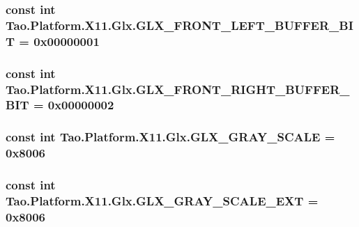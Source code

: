 \label{class_tao_1_1_platform_1_1_x11_1_1_glx_a9058319d3f2837e9c43e7822f0ce1f53}
\hypertarget{class_tao_1_1_platform_1_1_x11_1_1_glx_ab5e6633688255a2b3c1c2936c49b163e}{
\subsubsection[{GLX\_\-FRONT\_\-LEFT\_\-BUFFER\_\-BIT}]{\setlength{\rightskip}{0pt plus 5cm}const int {\bf Tao.Platform.X11.Glx.GLX\_\-FRONT\_\-LEFT\_\-BUFFER\_\-BIT} = 0x00000001}}
\label{class_tao_1_1_platform_1_1_x11_1_1_glx_ab5e6633688255a2b3c1c2936c49b163e}
\hypertarget{class_tao_1_1_platform_1_1_x11_1_1_glx_adc5d0545c96bfb8b1bdd0de0ef29cb0e}{
\subsubsection[{GLX\_\-FRONT\_\-RIGHT\_\-BUFFER\_\-BIT}]{\setlength{\rightskip}{0pt plus 5cm}const int {\bf Tao.Platform.X11.Glx.GLX\_\-FRONT\_\-RIGHT\_\-BUFFER\_\-BIT} = 0x00000002}}
\label{class_tao_1_1_platform_1_1_x11_1_1_glx_adc5d0545c96bfb8b1bdd0de0ef29cb0e}
\hypertarget{class_tao_1_1_platform_1_1_x11_1_1_glx_a5ba311a88aac071d258bcc41575e771c}{
\subsubsection[{GLX\_\-GRAY\_\-SCALE}]{\setlength{\rightskip}{0pt plus 5cm}const int {\bf Tao.Platform.X11.Glx.GLX\_\-GRAY\_\-SCALE} = 0x8006}}
\label{class_tao_1_1_platform_1_1_x11_1_1_glx_a5ba311a88aac071d258bcc41575e771c}
\hypertarget{class_tao_1_1_platform_1_1_x11_1_1_glx_a1c8bf824a1ae02d7bae31010865313f2}{
\subsubsection[{GLX\_\-GRAY\_\-SCALE\_\-EXT}]{\setlength{\rightskip}{0pt plus 5cm}const int {\bf Tao.Platform.X11.Glx.GLX\_\-GRAY\_\-SCALE\_\-EXT} = 0x8006}}
